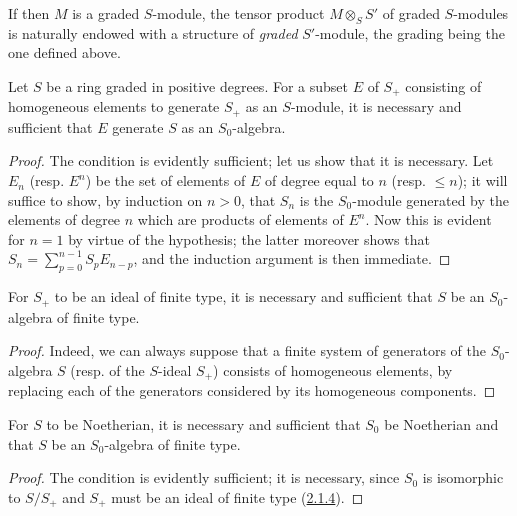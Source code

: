 \begin{env}[2.1.2]
If then $M$ is a graded $S$-module, the tensor product $M\otimes_S S'$
of graded $S$-modules is naturally endowed with a structure of
\emph{graded} $S'$-module, the grading being the one defined above.
\end{env}

\begin{lemma}[2.1.3]
\label{II.2.1.3}
Let $S$ be a ring graded in positive degrees. For a subset $E$ of $S_+$
consisting of homogeneous elements to generate $S_+$ as an $S$-module, it is
necessary and sufficient that $E$ generate $S$ as an $S_0$-algebra.
\end{lemma}

\begin{proof}
The condition is evidently sufficient; let us show that it is necessary.
Let $E_n$ (resp. $E^n$) be the set of elements of $E$ of degree equal to $n$
(resp. $\leq n$); it will suffice to show, by induction on $n>0$, that $S_n$
is the $S_0$-module generated by the elements of degree $n$ which are
products of elements of $E^n$. Now this is evident for $n=1$ by virtue of
the hypothesis; the latter moreover shows that
$S_n=\sum_{p=0}^{n-1}S_pE_{n-p}$, and the induction argument is then
immediate.
\end{proof}

\begin{corollary}[2.1.4]
\label{II.2.1.4}
For $S_+$ to be an ideal of finite type, it is necessary and sufficient that
$S$ be an $S_0$-algebra of finite type.
\end{corollary}

\begin{proof}
Indeed, we can always suppose that a finite system of generators of the
$S_0$-algebra $S$ (resp. of the $S$-ideal $S_+$) consists of homogeneous
elements, by replacing each of the generators considered by its homogeneous
components.
\end{proof}

\begin{corollary}[2.1.5]
\label{II.2.1.5}
For $S$ to be Noetherian, it is necessary and sufficient that $S_0$ be
Noetherian and that $S$ be an $S_0$-algebra of finite type.
\end{corollary}

\begin{proof}
The condition is evidently sufficient; it is necessary, since $S_0$
is isomorphic to $S/S_+$ and $S_+$ must be an ideal of finite type
(\hyperref[II.2.1.4]{2.1.4}).
\end{proof}

